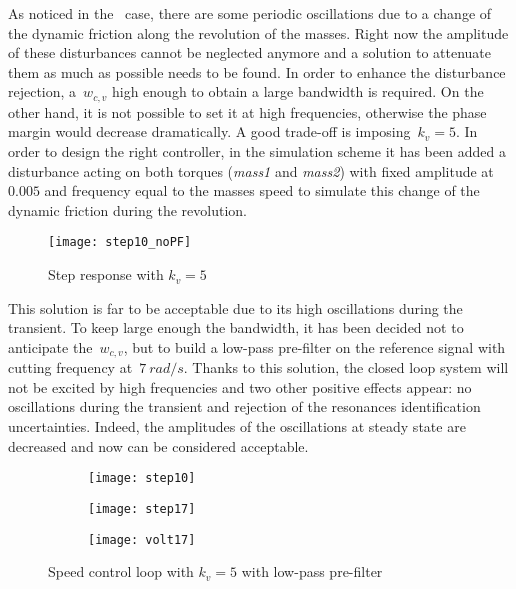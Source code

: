 As noticed in the \onedof~case, there are some periodic oscillations due to a change of the dynamic friction along the revolution of the masses. Right now the amplitude of these disturbances cannot be neglected anymore and a solution to attenuate them as much as possible needs to be found. In order to enhance the disturbance rejection, a~$w_{c,v}$ high enough to obtain a large bandwidth is required. On the other hand, it is not possible to set it at high frequencies, otherwise the phase margin would decrease dramatically. A good trade-off is imposing~$k_v=5$.
 In order to design the right controller, in the simulation scheme it has been added a disturbance acting on both torques (\textit{mass1} and \textit{mass2}) with fixed amplitude at~$0.005$ and frequency equal to the masses speed to simulate this change of the dynamic friction during the revolution.
\begin{figure*}[h]
	\centering
	\texttt{[image: step10\_noPF]}
	\caption{Step response with $k_v=5 $}
	\label{fig:step10_noPF}
\end{figure*}

This solution is far to be acceptable due to its high oscillations during the transient. To keep large enough the bandwidth, it has been decided not to anticipate the~$w_{c,v}$, but to build a low-pass pre-filter on the reference signal with cutting frequency at~$7\ rad/s$. Thanks to this solution, the closed loop system will not be excited by high frequencies and two other positive effects appear: no oscillations during the transient and rejection of the resonances identification uncertainties. Indeed, the amplitudes of the oscillations at steady state are decreased and now can be considered acceptable. 

\newpage
\begin{figure*}[h]
	\centering
\begin{subfigure}{0.4\columnwidth}
	\texttt{[image: step10]}
\end{subfigure}
\begin{subfigure}{0.4\columnwidth}
	\texttt{[image: step17]}
\end{subfigure}
\begin{subfigure}{0.4\columnwidth}
	\texttt{[image: volt17]}
\end{subfigure}
\caption{Speed control loop with $k_v=5$ with low-pass pre-filter}
\label{fig:PI_with_5}
\end{figure*}

